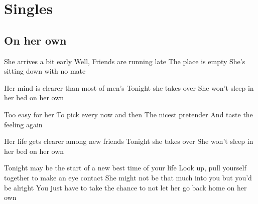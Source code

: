 \documentclass{article}
\newenvironment{album}[1]%
{%
  \section*{#1}
}%
{%
}
\newenvironment{song}[1]%
{%
  \subsection*{\textbf{#1}}
  \begin{multicols*}{2}
}%
{%
  \end{multicols*}
  \newpage
}
\newenvironment{couplet} %
{%
  \verbatim
}%
{% end code
  \endverbatim
}
\newenvironment{refrain} %
{%
  \verbatim
}%
{% end code
  \endverbatim
}
\newenvironment{pont} %
{%
  \verbatim
}%
{% end code
  \endverbatim
}
\begin{document}
\begin{album}{Singles}
\begin{song}{On her own}
\begin{couplet}
She arrives a bit early
Well, Friends are running late
The place is empty
She's sitting down with no mate
\end{couplet}
\begin{refrain}
Her mind is clearer than most of men's
Tonight she  takes over 
She won't sleep in her bed 
on her own
\end{refrain}
\begin{couplet}
Too easy for her
To pick every now and then
The nicest pretender
And taste the feeling again
\end{couplet}
\begin{refrain}
Her life gets clearer among new friends
Tonight she takes over 
She won't sleep in her bed 
on her own  
\end{refrain}
\begin{pont}
Tonight may be the start of a new best time of your life
Look up, pull yourself together to make an eye contact
She might not be that much into you but you'd be alright
You just have to take the chance to not let her go back home
on her own
\end{pont}
\end{song}


\end{album}
\end{document}
